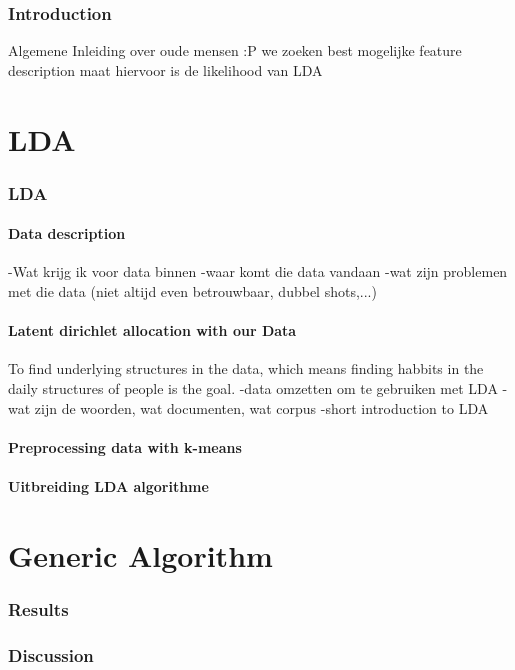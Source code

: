 \documentclass[11pt,a4paper]{report}
\begin{document}
\section{Introduction}
Algemene Inleiding over oude mensen :P
we zoeken  best mogelijke feature description
maat hiervoor is de likelihood van LDA



\part{LDA}
\section{LDA}
\subsection{Data description}
-Wat krijg ik voor data binnen
-waar komt die data vandaan
-wat zijn problemen met die data (niet altijd even betrouwbaar, dubbel shots,...)


\subsection{Latent dirichlet allocation with our Data}
To find underlying structures in the data, which means finding habbits in the daily structures of people is the goal.
-data omzetten om te gebruiken met LDA
-wat zijn de woorden, wat documenten, wat corpus
-short introduction to LDA

\subsection{Preprocessing data with k-means}


\subsection{Uitbreiding LDA algorithme}


\part{Generic Algorithm}


\section{Results}


\section{Discussion}
\end{document}
